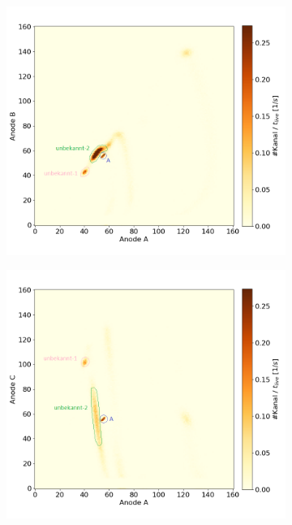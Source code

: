 \begin{figure}[H]
    \centering
    \begin{subfigure}{0.47\textwidth}
        \centering
        \includegraphics[width=\linewidth]{Pictures/Gasdetektor/19_probe_AB.png}
    \end{subfigure}
    \begin{subfigure}{0.47\textwidth}
        \centering
        \includegraphics[width=\linewidth]{Pictures/Gasdetektor/19_probe_AC.png}

\end{subfigure}
\end{figure}
